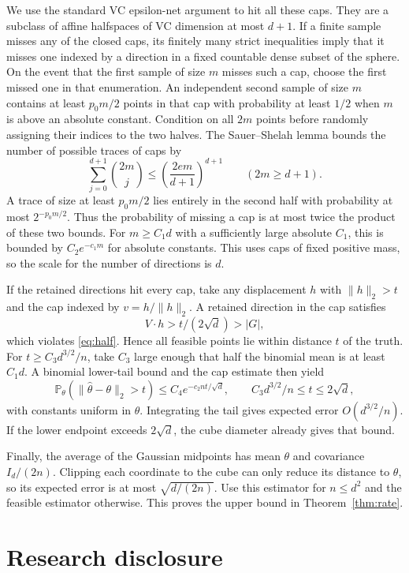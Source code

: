 \documentclass[11pt,a4paper]{amsart}
\begin{document}
We use the standard VC epsilon-net argument \cite{hw} to hit all these caps. They are a subclass of affine halfspaces of VC dimension at most \(d+1\). If a finite sample misses any of the closed caps, its finitely many strict inequalities imply that it misses one indexed by a direction in a fixed countable dense subset of the sphere. On the event that the first sample of size \(m\) misses such a cap, choose the first missed one in that enumeration. An independent second sample of size \(m\) contains at least \(p_0m/2\) points in that cap with probability at least \(1/2\) when \(m\) is above an absolute constant. Condition on all \(2m\) points before randomly assigning their indices to the two halves. The Sauer--Shelah lemma bounds the number of possible traces of caps by
\[
 \sum_{j=0}^{d+1}\binom{2m}{j}
 \le \left(\frac{2em}{d+1}\right)^{d+1}
 \qquad (2m\ge d+1).
\]
A trace of size at least \(p_0 m/2\) lies entirely in the second half with probability at most \(2^{-p_0m/2}\). Thus the probability of missing a cap is at most twice the product of these two bounds. For \(m\ge C_1d\) with a sufficiently large absolute \(C_1\), this is bounded by \(C_2e^{-c_1m}\) for absolute constants. This uses caps of fixed positive mass, so the scale for the number of directions is \(d\).

If the retained directions hit every cap, take any displacement \(h\) with \(\|h\|_2>t\) and the cap indexed by \(v=h/\|h\|_2\). A retained direction in the cap satisfies
\[
 V\cdot h > t/(2\sqrt d) > |G|,
\]
which violates \eqref{eq:half}. Hence all feasible points lie within distance \(t\) of the truth. For \(t\ge C_3d^{3/2}/n\), take \(C_3\) large enough that half the binomial mean is at least \(C_1d\). A binomial lower-tail bound and the cap estimate then yield
\[
 \mathbb P_\theta(\|\widehat\theta-\theta\|_2>t)
 \le C_4 e^{-c_2nt/\sqrt d},\qquad
 C_3d^{3/2}/n\le t\le 2\sqrt d,
\]
with constants uniform in \(\theta\). Integrating the tail gives expected error \(O(d^{3/2}/n)\). If the lower endpoint exceeds \(2\sqrt d\), the cube diameter already gives that bound.

Finally, the average of the Gaussian midpoints has mean \(\theta\) and covariance \(I_d/(2n)\). Clipping each coordinate to the cube can only reduce its distance to \(\theta\), so its expected error is at most \(\sqrt{d/(2n)}\). Use this estimator for \(n\le d^2\) and the feasible estimator otherwise. This proves the upper bound in Theorem~\ref{thm:rate}.

\section*{Research disclosure}
\end{document}
